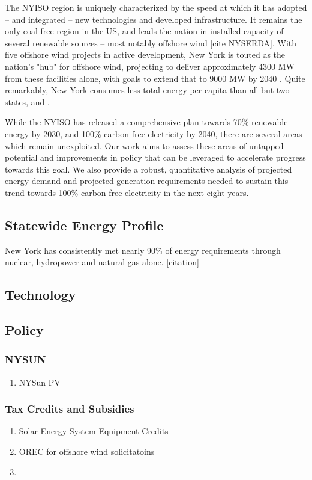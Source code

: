 \documentclass[plain]{article}
\newcommand{\1}{\mathbbm{1}}
\begin{document}
The NYISO region is uniquely characterized by the speed at which it has adopted -- and integrated -- new technologies and developed infrastructure. It remains the only coal free region in the US, and leads the nation in installed capacity of several renewable sources -- most notably offshore wind [cite NYSERDA]. With five offshore wind projects in active development, New York is touted as the nation's "hub" for offshore wind, projecting to deliver approximately 4300 MW from these facilities alone, with goals to extend that to 9000 MW by 2040 . Quite remarkably, New York consumes less total energy per capita than all but two states, and .

While the NYISO has released a comprehensive plan towards 70\% renewable energy by 2030, and 100\% carbon-free electricity by 2040, 
there are several areas which remain unexploited. Our work aims to assess these areas of untapped potential and improvements in policy that can be leveraged to accelerate progress towards this goal. We also provide a robust, quantitative analysis of projected energy demand and projected generation requirements needed to sustain this trend towards 100\% carbon-free electricity in the next eight years.

\subsection{Statewide Energy Profile}
New York has consistently met nearly 90\% of energy requirements through nuclear, hydropower and natural gas alone. [citation]
\subsection{Technology}

\subsection{Policy}
\subsubsection{NYSUN}
\begin{enumerate}
	\item NYSun PV
\end{enumerate}
\subsubsection{Tax Credits and Subsidies}
\begin{enumerate}
	\item Solar Energy System Equipment Credits
	\item OREC for offshore wind solicitatoins
	\item 
\end{enumerate}
\end{document}
